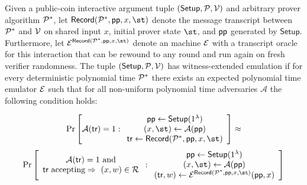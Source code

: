 
\begin{definition}\label{def:wee}
Given a public-coin interactive argument tuple $(\textsf{Setup}, \mathcal{P}, \mathcal{V})$ and arbitrary prover algorithm $\mathcal{P}^*$, let $\textsf{Record}(\prover^*, \params, x, \st)$ denote the message transcript between $\mathcal{P}^*$ and $\mathcal{V}$ on shared input $x$, initial prover state $\st$, and $\textsf{pp}$ generated by $\textsf{Setup}$. Furthermore, let $\emu^{\textsf{Record}(\prover^*, \params, x, \st)}$ denote an machine $\mathcal{E}$ with a transcript oracle for this interaction that can be rewound to any round and run again on fresh verifier randomness. The tuple $(\textsf{Setup}, \mathcal{P}, \mathcal{V})$ has witness-extended emulation if for every deterministic polynomial time $\mathcal{P}^*$ there exists an expected polynomial time emulator $\mathcal{E}$ such that for all non-uniform polynomial time adversaries $\mathcal{A}$ the following condition holds: 
\begin{small}
\[
\Pr \left[
\mathcal{A}(\textsf{tr}) = 1
:
\begin{array}{c}
             \params \leftarrow \textsf{Setup}(1^\lambda) \\
             (x, \st) \leftarrow \mathcal{A}(\params) \\
             \tr \leftarrow \textsf{Record}(\prover^*, \params, x, \st)
\end{array} 
\right] \approx
\]
\[
\Pr \left[
\begin{array}{c} 
\mathcal{A}(\textsf{tr}) = 1 \ \text{and} \\ 
\text{\tr~accepting} \Rightarrow \ (x, w) \in \mathcal{R}
\end{array} 
:
\begin{array}{c}
             \params \leftarrow \textsf{Setup}(1^\lambda) \\
             (x, \st) \leftarrow \mathcal{A}(\params) \\
(\textsf{tr}, w) \leftarrow \emu^{\textsf{Record}(\prover^*, \params, x, \st)}(\params, x)
\end{array}
\right]
\]
\end{small}
\end{definition}

